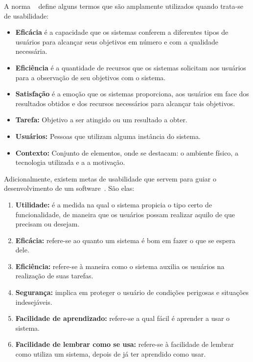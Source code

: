  A norma ~ define alguns termos que são amplamente utilizados quando trata-se de usabilidade:

\begin{itemize}
\item \textbf{Eficácia} é a capacidade que os sistemas conferem a diferentes tipos de usuários para alcançar seus objetivos em número e com a qualidade necessária. 

\item \textbf{Eficiência} é a quantidade de recursos que os sistemas solicitam aos usuários para a observação de seu objetivos com o sistema.

\item \textbf{Satisfação} é a emoção que os sistemas proporciona, aos usuários em face dos resultados obtidos e dos recursos necessários para alcançar tais objetivos. 

\item \textbf{Tarefa:} Objetivo a ser atingido ou um resultado a obter.

\item \textbf{Usuários:} Pessoas que utilizam alguma instância do sistema.

\item \textbf{Contexto:} Conjunto de elementos, onde se destacam: o ambiente físico, a tecnologia utilizada e a a motivação.
\end{itemize}

Adicionalmente, existem metas de usabilidade que servem para guiar o desenvolvimento de um software~\cite{preece2007}. São elas:

\begin{enumerate}
	\item \textbf{Utilidade:} é a medida na qual o sistema propicia o tipo certo de funcionalidade, de maneira que os usuários possam realizar aquilo de que precisam ou desejam.
	\item \textbf{Eficácia:} refere-se ao quanto um sistema é bom em fazer o que se espera dele.
	\item \textbf{Eficiência:} refere-se à maneira como o sistema auxilia os usuários na realização de suas tarefas.
	\item \textbf{Segurança:} implica em proteger o usuário de condições perigosas e situações indesejáveis.
	\item \textbf{Facilidade de aprendizado:} refere-se a qual fácil é aprender a usar o sistema.
	\item \textbf{Facilidade de lembrar como se usa:} refere-se à facilidade de lembrar como utiliza um sistema, depois de já ter aprendido como usar.
\end{enumerate}

